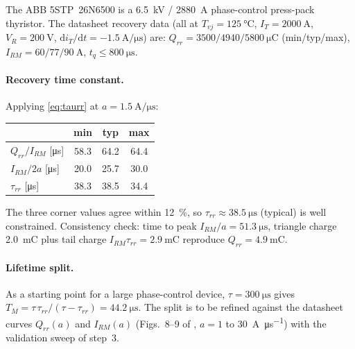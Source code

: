 \documentclass[11pt,a4paper]{article}
\begin{document}
The ABB 5STP~26N6500 \cite{abb26n6500} is a \SI{6.5}{\kilo\volt} /
\SI{2880}{\ampere} phase-control press-pack thyristor. The datasheet
recovery data (all at $T_{vj} = \SI{125}{\celsius}$,
$I_T = \SI{2000}{\ampere}$, $V_R = \SI{200}{\volt}$,
$\mathrm{d}i_T/\mathrm{d}t = \SI{-1.5}{\ampere\per\micro\second}$) are:
$Q_{rr} = 3500/4940/5800~\si{\micro\coulomb}$ (min/typ/max),
$I_{RM} = 60/77/90~\si{\ampere}$, $t_q \le \SI{800}{\micro\second}$.

\paragraph{Recovery time constant.} Applying \eqref{eq:taurr} at
$a = \SI{1.5}{\ampere\per\micro\second}$:

\begin{center}
\begin{tabular}{lccc}
\toprule
 & min & typ & max \\
\midrule
$Q_{rr}/I_{RM}$ [\si{\micro\second}] & 58.3 & 64.2 & 64.4 \\
$I_{RM}/2a$ [\si{\micro\second}]     & 20.0 & 25.7 & 30.0 \\
$\tau_{rr}$ [\si{\micro\second}]     & 38.3 & 38.5 & 34.4 \\
\bottomrule
\end{tabular}
\end{center}

The three corner values agree within \SI{12}{\percent}, so
$\tau_{rr} \approx \SI{38.5}{\micro\second}$ (typical) is well constrained.
Consistency check: time to peak $I_{RM}/a = \SI{51.3}{\micro\second}$,
triangle charge \SI{2.0}{\milli\coulomb} plus tail charge
$I_{RM}\tau_{rr} = \SI{2.9}{\milli\coulomb}$ reproduce
$Q_{rr} = \SI{4.9}{\milli\coulomb}$.

\paragraph{Lifetime split.} As a starting point for a large phase-control
device, $\tau = \SI{300}{\micro\second}$ gives
$T_M = \tau\,\tau_{rr}/(\tau - \tau_{rr}) = \SI{44.2}{\micro\second}$. The
split is to be refined against the datasheet curves $Q_{rr}(a)$ and
$I_{RM}(a)$ (Figs.~8--9 of \cite{abb26n6500}, $a = 1$ to
\SI{30}{\ampere\per\micro\second}) with the validation sweep of step~3.
\end{document}

